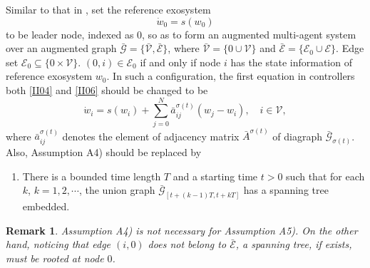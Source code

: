 \documentclass[onecolumn,a4paper,12pt]{article}
\newtheorem{remark}{Remark}
\numberwithin{equation}{section}
\begin{document}
Similar to that in \cite{WangTAC2010}, set the reference exosystem
\begin{equation} \label{IV01}
  \dot{w}_0=s(w_0)
\end{equation}
to be leader node, indexed as $0$, so as to form an augmented multi-agent system over an augmented graph $\bar{\mathcal{G}}=\{\bar{\mathcal{V}},\bar{\mathcal{E}}\}$, where $\bar{\mathcal{V}}=\{0\cup\mathcal{V}\}$ and $\bar{\mathcal{E}}=\{\mathcal{E}_0\cup\mathcal{E}\}$. Edge set $\mathcal{E}_0\subseteq \{0 \times \mathcal{V}\}$. $(0,i)\in\mathcal{E}_0$ if and only if node $i$ has the state information of reference exosystem $w_0$. In such a configuration, the first equation in controllers both \eqref{II04} and \eqref{II06} should be changed to be
\begin{equation}
  \dot{w}_i=s(w_i)+\sum_{j=0}^N \bar{a}_{ij}^{\sigma(t)}(w_j-w_i), \quad i\in\mathcal{V},
\end{equation}
where $\bar{a}^{\sigma(t)}_{ij}$ denotes the element of adjacency matrix $\bar{A}^{\sigma(t)}$ of diagraph $\bar{\mathcal{G}}_{\sigma(t)}$. Also, Assumption A4) should be replaced by
\begin{enumerate}
 \item[A5)] There is a bounded time length $T$ and a starting time $t>0$ such that for each $k$, $k=1,2,\cdots$, the union graph $\bar{\mathcal{G}}_{[t+(k-1)T,t+kT]}$ has a spanning tree embedded.
\end{enumerate}
\begin{remark}
 Assumption A4) is not necessary for Assumption A5). On the other hand, noticing that edge $(i,0)$ does not belong to $\bar{\mathcal{E}}$, a spanning tree, if exists, must be rooted at node $0$.
\end{remark}
\end{document}
